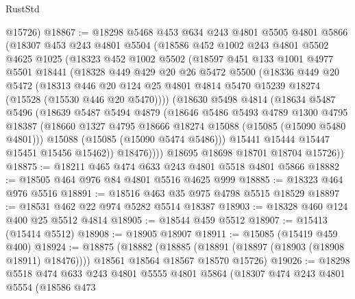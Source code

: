\begin{lexlean}{RustStd}
\begin{coremodule}
      @15726)
@18867 := @18298
    @5468
    @453
    @634
    @243
    @4801
    @5505
    @4801
    @5866
    (@18307
      @453
      @243
      @4801
      @5504
      (@18586
        @452
        @1002
        @243
        @4801
        @5502
        @4625
        @1025
        (@18323
          @452
          @1002
          @5502
          (@18597
            @451
            @133
            @1001
            @4977
            @5501
            @18441
            (@18328
              @449
              @429
              @20
              @26
              @5472
              @5500
              (@18336
                @449
                @20
                @5472
                (@18313
                  @446
                  @20
                  @124
                  @25
                  @4801
                  @4814
                  @5470
                  @15239
                  @18274
                  (@15528 (@15530 @446 @20 @5470))))
              (@18630
                @5498
                @4814
                (@18634
                  @5487
                  @5496
                  (@18639
                    @5487
                    @5494
                    @4879
                    (@18646
                      @5486
                      @5493
                      @4789
                      @1300
                      @4795
                      @18387
                      (@18660 @1327 @4795 @18666 @18274 @15088 (@15085 (@15090 @5480 @4801)))
                      @15088
                      (@15085 (@15090 @5474 @5486)))
                    @15441
                    @15444
                    @15447
                    @15451
                    @15456
                    @15462))
                @18476))))
        @18695
        @18698
        @18701
        @18704
        @15726))
@18875 := @18211 @465 @474 @633 @243 @4801 @5518 @4801 @5866
@18882 := @18505 @464 @976 @84 @4801 @5516 @4625 @999
@18885 := @18323 @464 @976 @5516
@18891 := @18516 @463 @35 @975 @4798 @5515 @18529
@18897 := @18531 @462 @22 @974 @5282 @5514 @18387
@18903 := @18328 @460 @124 @400 @25 @5512 @4814
@18905 := @18544 @459 @5512
@18907 := @15413 (@15414 @5512)
@18908 := @18905 @18907
@18911 := @15085 (@15419 @459 @400)
@18924 := @18875
    (@18882
      (@18885 (@18891 (@18897 (@18903 (@18908 @18911) @18476))))
      @18561
      @18564
      @18567
      @18570
      @15726)
@19026 := @18298
    @5518
    @474
    @633
    @243
    @4801
    @5555
    @4801
    @5864
    (@18307
      @474
      @243
      @4801
      @5554
      (@18586
        @473

\end{coremodule}
\end{lexlean}

